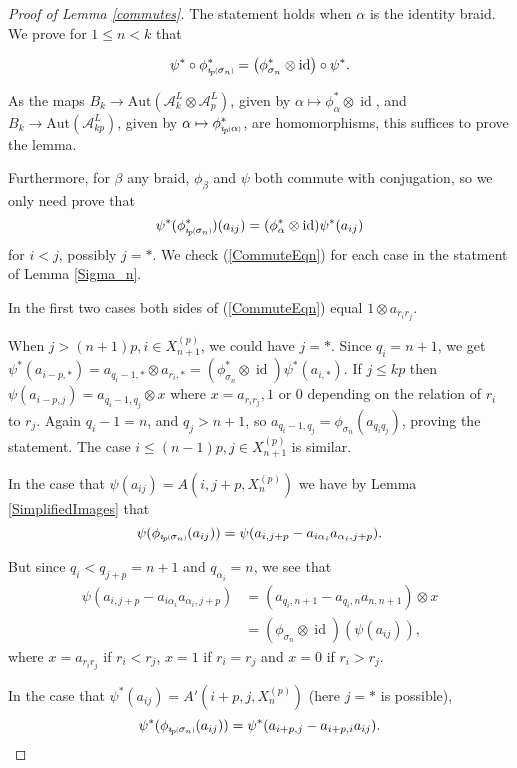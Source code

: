 \documentclass[11pt]{amsart}
\def\A{{\mathcal A}}
\def\s{{\sigma}}
\def\a{\alpha}
\newcommand*{\subsmallp}[1]{\scalebox{.5}{\ensuremath#1}}
\newcommand{\subpp}[2][p]{\imath_{\hspace*{-1pt}#1}\hspace*{-.5pt}\subsmallp(#2\subsmallp)}
\newcommand\id{\operatorname{id}}
\theoremstyle{definition}
\begin{document}
\begin{proof} [Proof of Lemma \ref{commutes}]
The statement holds when $\alpha$ is the identity braid. We prove for $1\le n < k$ that

$$\psi^\ast\circ\phi^\ast_{\subpp{\s_n}} = \left(\phi^\ast_{\s_n}\otimes \id\right)\circ\psi^\ast.$$

As the maps $B_{k} \to \text{Aut}(\A_k^L\otimes\A_p^L)$, given by $\alpha \mapsto \phi^\ast_\alpha\otimes\id$, and $B_k \to \text{Aut}(\A_{kp}^L)$, given by $\alpha \mapsto \phi^\ast_{\subpp\alpha}$, are homomorphisms, this suffices to prove the lemma.

Furthermore, for $\beta$ any braid, $\phi_\beta$ and $\psi$ both commute with conjugation, so we only need prove that 
      \begin{equation}\label{CommuteEqn}
      \psi^\ast(\phi^\ast_{\subpp{\s_n}})(a_{ij})=(\phi^\ast_\alpha\otimes\id)\psi^\ast(a_{ij})
      \end{equation}
for $i<j$, possibly $j=\ast$. We check (\ref{CommuteEqn}) for each case in the statment of Lemma \ref{Sigma_n}. 

In the first two cases both sides of (\ref{CommuteEqn}) equal $1\otimes a_{r_ir_j}$. 

When $j>(n+1)p, i\in X_{n+1}^{(p)}$, we could have $j=\ast$. Since $q_i=n+1$, we get $\psi^\ast(a_{i-p,\ast})=a_{q_i-1,\ast}\otimes a_{r_i,\ast}=(\phi^\ast_{\s_n}\otimes\id)\psi^\ast(a_{i,\ast})$. If $j\le kp$ then $\psi(a_{i-p,j}) = a_{q_i-1,q_j}\otimes x$ where $x=a_{r_ir_j}, 1$ or $0$ depending on the relation of $r_i$ to $r_j$. Again $q_i-1=n$, and $q_j>n+1$, so $a_{q_i-1,q_j}=\phi_{\s_n}(a_{q_iq_j})$, proving the statement. The case $i\le (n-1)p,j\in X_{n+1}^{(p)}$ is similar.

In the case that $\psi(a_{ij}) = A(i,j+p,X_n^{(p)})$ we have by Lemma \ref{SimplifiedImages} that
$$\psi(\phi_{\subpp{\s_n}}(a_{ij})) = \psi(a_{i,j+p}-a_{i\a_i}a_{\a_i,j+p}).$$

\noindent But since $q_i<q_{j+p} = n+1$ and $q_{\a_i}=n$, we see that
\begin{align*}
\psi(a_{i,j+p} - a_{i\a_i}a_{\a_i,j+p}) &= (a_{q_i,n+1} - a_{q_i,n}a_{n,n+1})\otimes x\\
&= (\phi_{\s_n} \otimes \id)(\psi(a_{ij})),
\end{align*}
\noindent where $x=a_{r_ir_j}$ if $r_i<r_j$, $x=1$ if $r_i=r_j$ and $x=0$ if $r_i>r_j$.

In the case that $\psi^\ast(a_{ij}) = A'(i+p,j,X_n^{(p)})$ (here $j=\ast$ is possible),
$$\psi^\ast(\phi_{\subpp{\s_n}}(a_{ij})) = \psi^\ast(a_{i+p,j}-a_{i+p,i}a_{ij}).$$


\end{proof}
\end{document}
